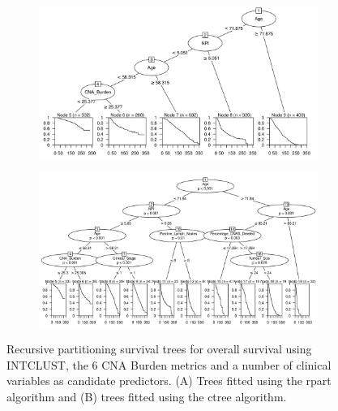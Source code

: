 \begin{figure}[!htb]
\centering

\vspace{1cm}

\begin{subfigure}{\textwidth}
\subcaption{}
\includegraphics[width=1\textwidth]{../figures/Appendices/Appendix_B/Clin_PartyKit_Survival_Burden_OS_INTCLUST.png}
\end{subfigure}

\vspace{2cm}

\begin{subfigure}{\textwidth}
\subcaption{}
\includegraphics[width=1\textwidth]{../figures/Appendices/Appendix_B/Clin_Ctree_Survival_Burden_OS_INTCLUST.png}
\end{subfigure}

\vspace{1cm}

\caption[Recursive partitioning survival trees for overall survival using INTCLUST, the 6 CNA Burden metrics and a number of clinical variables as candidate predictors.]{Recursive partitioning survival trees for overall survival using INTCLUST, the 6 CNA Burden metrics and a number of clinical variables as candidate predictors. (A) Trees fitted using the rpart algorithm and (B) trees fitted using the ctree algorithm.}
\end{figure}

